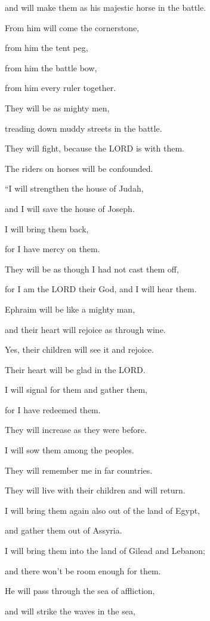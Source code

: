 and will make them as his majestic horse in the battle.

\myverse{}From him will come the cornerstone,

from him the tent peg,

from him the battle bow,

from him every ruler together.

\myverse{}They will be as mighty men,

treading down muddy streets in the battle.

They will fight, because the LORD is with them.

The riders on horses will be confounded.


\vspace{\baselineskip} \myverse{}“I will strengthen the house of Judah,

and I will save the house of Joseph.

I will bring them back,

for I have mercy on them.

They will be as though I had not cast them off,

for I am the LORD their God, and I will hear them.

\myverse{}Ephraim will be like a mighty man,

and their heart will rejoice as through wine.

Yes, their children will see it and rejoice.

Their heart will be glad in the LORD.

\myverse{}I will signal for them and gather them,

for I have redeemed them.

They will increase as they were before.

\myverse{}I will sow them among the peoples.

They will remember me in far countries.

They will live with their children and will return.

\myverse{}I will bring them again also out of the land of Egypt,

and gather them out of Assyria.

I will bring them into the land of Gilead and Lebanon;

and there won’t be room enough for them.

\myverse{}He will pass through the sea of affliction,

and will strike the waves in the sea,

